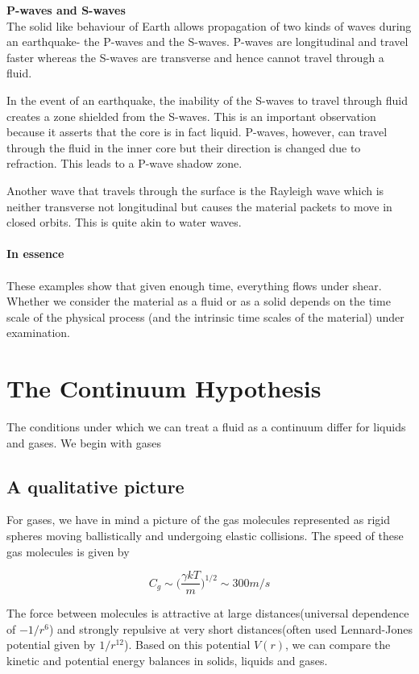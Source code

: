 \documentclass[11pt, letterpaper]{article}
\begin{document}
\textbf{P-waves and S-waves}\\

The solid like behaviour of Earth allows propagation of two kinds of waves 
during an earthquake- the P-waves and the S-waves. P-waves are longitudinal and travel faster whereas the S-waves are transverse and hence cannot travel through a fluid.

In the event of an earthquake, the inability of the S-waves to travel through fluid creates a zone shielded from the S-waves. This is an important observation because it asserts that the core is in fact liquid. P-waves, however, can travel through the fluid in the inner core but their direction is changed due to refraction. This leads to a P-wave shadow zone. 

Another wave that travels through the surface is the Rayleigh wave which is neither transverse not longitudinal but causes the material packets to move in closed orbits. This is quite akin to water waves.\\
\\
\textbf{In essence}\\
\\
These examples show that given enough time, everything flows under shear. 
Whether we consider the material as a fluid or as a solid depends on the time scale of the physical process (and the intrinsic time scales of the material) under examination. 

\section{The Continuum Hypothesis}

The conditions under which we can treat a fluid as a continuum differ for 
liquids and gases. We begin with gases

\subsection{A qualitative picture}
For gases, we have in mind a picture of the gas molecules represented as rigid spheres moving ballistically and undergoing elastic collisions. The speed of these gas molecules is given by 

$$
C_g \sim \bigg(\frac{\gamma k T}{m}\bigg)^{1/2} \sim 300m/s
$$

The force between molecules is attractive at large distances(universal dependence of $-1/r^6$) and strongly repulsive at very short distances(often 
used Lennard-Jones potential given by $1/r^{12}$). Based on this potential $V(r)$, we can compare the kinetic and potential energy balances in solids, liquids and gases.
\end{document}
